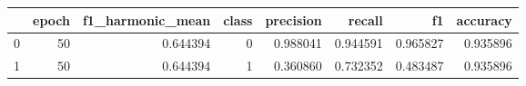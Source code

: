\begin{tabular}{lrrrrrrr}
\toprule
 & epoch & f1_harmonic_mean & class & precision & recall & f1 & accuracy \\
\midrule
0 & 50 & 0.644394 & 0 & 0.988041 & 0.944591 & 0.965827 & 0.935896 \\
1 & 50 & 0.644394 & 1 & 0.360860 & 0.732352 & 0.483487 & 0.935896 \\
\bottomrule
\end{tabular}
